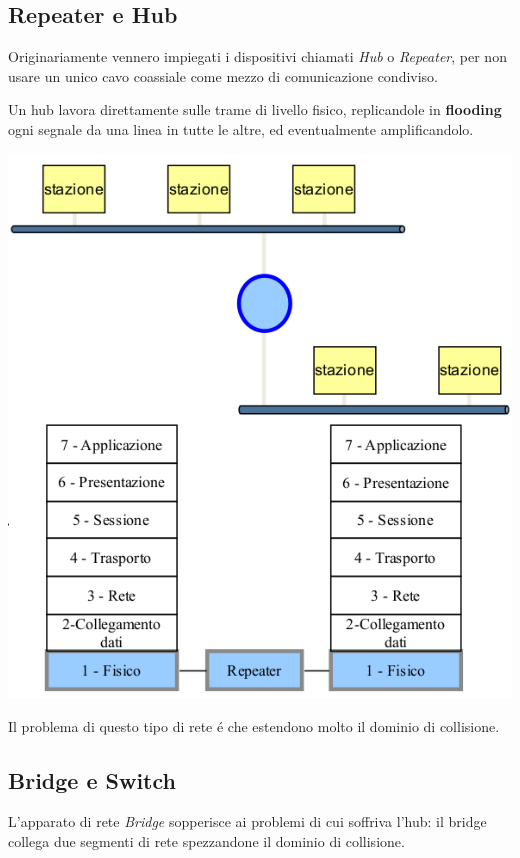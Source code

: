 \documentclass[12pt]{article}
\begin{document}
\subsection{Repeater e Hub}\label{ieee-802-repeater-hub}
Originariamente vennero impiegati i dispositivi chiamati \textit{Hub} o \textit{Repeater}, per non usare un unico cavo
coassiale come mezzo di comunicazione condiviso.

Un hub lavora direttamente sulle trame di livello fisico, replicandole in \textbf{flooding} ogni segnale da una linea in
tutte le altre, ed eventualmente amplificandolo.
\begin{center}
	\includegraphics[scale=0.35]{livello_collegamento-img13.png}
\end{center}
Il problema di questo tipo di rete \'e che estendono molto il dominio di collisione.


\subsection{Bridge e Switch}\label{ieee-802-bridge-switch}
L'apparato di rete \textit{Bridge} sopperisce ai problemi di cui soffriva l'hub: il bridge collega due segmenti di rete
spezzandone il dominio di collisione. 
\end{document}
